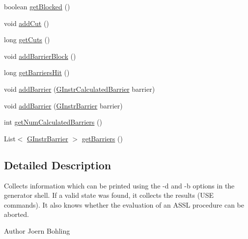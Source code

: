 \begin{DoxyCompactItemize}
\item 
boolean \hyperlink{classorg_1_1tzi_1_1use_1_1gen_1_1tool_1_1_g_collector_impl_a1019ce3500960bb03eacbd861c410351}{get\-Blocked} ()
\item 
void \hyperlink{classorg_1_1tzi_1_1use_1_1gen_1_1tool_1_1_g_collector_impl_ad3acfdab9afc02f67dabdd277e79681c}{add\-Cut} ()
\item 
long \hyperlink{classorg_1_1tzi_1_1use_1_1gen_1_1tool_1_1_g_collector_impl_ae960f7bfa9dacca5254f4f42db177a0e}{get\-Cuts} ()
\item 
void \hyperlink{classorg_1_1tzi_1_1use_1_1gen_1_1tool_1_1_g_collector_impl_a8814b4c165049d1c0866af5ad2562c81}{add\-Barrier\-Block} ()
\item 
long \hyperlink{classorg_1_1tzi_1_1use_1_1gen_1_1tool_1_1_g_collector_impl_aada9cd1e5bd46321ed82c9e71998b9a4}{get\-Barriers\-Hit} ()
\item 
void \hyperlink{classorg_1_1tzi_1_1use_1_1gen_1_1tool_1_1_g_collector_impl_a2c6cd7ad655b8632ffcfa57b76b45070}{add\-Barrier} (\hyperlink{classorg_1_1tzi_1_1use_1_1gen_1_1assl_1_1statics_1_1_g_instr_calculated_barrier}{G\-Instr\-Calculated\-Barrier} barrier)
\item 
void \hyperlink{classorg_1_1tzi_1_1use_1_1gen_1_1tool_1_1_g_collector_impl_a1739a9b28f996e46ad0ac94913eb89a4}{add\-Barrier} (\hyperlink{classorg_1_1tzi_1_1use_1_1gen_1_1assl_1_1statics_1_1_g_instr_barrier}{G\-Instr\-Barrier} barrier)
\item 
int \hyperlink{classorg_1_1tzi_1_1use_1_1gen_1_1tool_1_1_g_collector_impl_afd9fef3c85259e06e042d55daae855fb}{get\-Num\-Calculated\-Barriers} ()
\item 
List$<$ \hyperlink{classorg_1_1tzi_1_1use_1_1gen_1_1assl_1_1statics_1_1_g_instr_barrier}{G\-Instr\-Barrier} $>$ \hyperlink{classorg_1_1tzi_1_1use_1_1gen_1_1tool_1_1_g_collector_impl_afb4d8719b3eb7e3571f54878726fc87b}{get\-Barriers} ()
\end{DoxyCompactItemize}


\subsection{Detailed Description}
Collects information which can be printed using the -\/d and -\/b options in the generator shell. If a valid state was found, it collects the results (U\-S\-E commands). It also knows whether the evaluation of an A\-S\-S\-L procedure can be aborted. \begin{DoxyAuthor}{Author}
Joern Bohling 
\end{DoxyAuthor}



